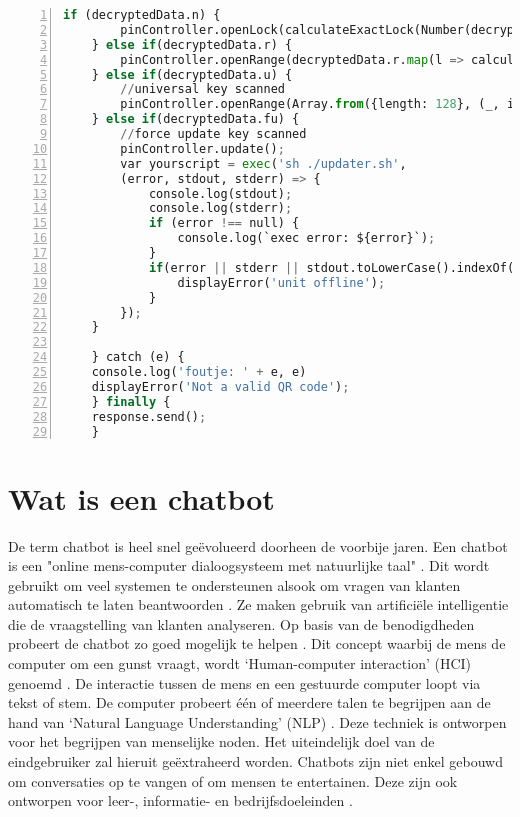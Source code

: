 \begin{lstlisting}[language=Python, caption={Openen van juiste locker of foutboodschap.}, label=lst:pythonPinController, numbers=left]
    if (decryptedData.n) {
        pinController.openLock(calculateExactLock(Number(decryptedData.n), Number(config.unit)));
    } else if(decryptedData.r) {
        pinController.openRange(decryptedData.r.map(l => calculateExactLock(Number(l), Number(config.unit))))
    } else if(decryptedData.u) {
        //universal key scanned
        pinController.openRange(Array.from({length: 128}, (_, i) => i + 1))
    } else if(decryptedData.fu) {
        //force update key scanned
        pinController.update();
        var yourscript = exec('sh ./updater.sh',
        (error, stdout, stderr) => {
            console.log(stdout);
            console.log(stderr);
            if (error !== null) {
                console.log(`exec error: ${error}`);
            }
            if(error || stderr || stdout.toLowerCase().indexOf('offline') > -1) {
                displayError('unit offline');
            }
        });
    }
    
    } catch (e) {
    console.log('foutje: ' + e, e)
    displayError('Not a valid QR code');
    } finally {
    response.send();
    }
\end{lstlisting}

\newpage


\section{Wat is een chatbot}%
\label{sec:chatbot}

De term chatbot is heel snel geëvolueerd doorheen de voorbije jaren. Een chatbot is een "online mens-computer dialoogsysteem met natuurlijke taal" \autocite{Jia2003}. Dit wordt gebruikt om veel systemen te ondersteunen alsook om vragen van klanten automatisch te laten beantwoorden \autocite{Adamopoulou2020}. Ze maken gebruik van artificiële intelligentie die de vraagstelling van klanten analyseren. Op basis van de benodigdheden probeert de chatbot zo goed mogelijk te helpen \autocite{Khanna2015}. Dit concept waarbij de mens de computer om een gunst vraagt, wordt ‘Human-computer interaction’ (HCI) genoemd \autocite{Adamopoulou2020}. De interactie tussen de mens en een gestuurde computer loopt via tekst of stem. De computer probeert één of meerdere talen te begrijpen aan de hand van ‘Natural Language Understanding’ (NLP) \autocite{Khanna2015a}. Deze techniek is ontworpen voor het begrijpen van menselijke noden. Het uiteindelijk doel van de eindgebruiker zal hieruit geëxtraheerd worden.  Chatbots zijn niet enkel gebouwd om conversaties op te vangen of om mensen te entertainen. Deze zijn ook ontworpen voor leer-, informatie- en bedrijfsdoeleinden \autocite{Shawar2007}. 

